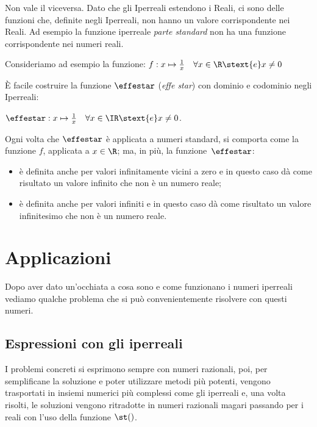 \begin{osservazione}
Non vale il viceversa. Dato che gli Iperreali estendono i Reali, ci sono 
delle funzioni che, definite negli Iperreali, non hanno un valore 
corrispondente nei Reali. Ad esempio la funzione iperreale \emph{parte 
standard} non ha una funzione corrispondente nei numeri reali.

\begin{esempio}
Consideriamo ad esempio la funzione: 
\(f: x \mapsto \frac{1}{x} \quad \forall x \in \R \stext{e} x \ne 0\)

È facile costruire la funzione \(\effestar\) (\emph{effe star}) con 
dominio e codominio negli Iperreali:

\(\effestar: x \mapsto \frac{1}{x} \quad 
\forall x \in \IR \stext{e} x \ne 0\).

Ogni volta che \(\effestar\) è applicata a numeri standard, si 
comporta come la funzione \(f\), applicata a \(x \in \R\); 
ma, in più, la funzione~\(\effestar\):
\begin{itemize} [noitemsep]
 \item 
è definita anche per valori infinitamente vicini a zero e 
in questo caso dà come risultato un valore infinito che non è un numero 
reale;
 \item 
è definita anche per valori infiniti e
in questo caso dà come risultato un valore infinitesimo che non è un numero 
reale. 
\end{itemize}
\end{esempio}
\end{osservazione}

\section{Applicazioni}
\label{sec:insnum_applicazioni}

Dopo aver dato un'occhiata a cosa sono e come funzionano i numeri 
iperreali vediamo qualche problema che si può convenientemente risolvere 
con questi numeri.

\subsection{Espressioni con gli iperreali}
\label{subsec:insnum_espressioni}

I problemi concreti si esprimono sempre con numeri razionali, poi, per 
semplificane la soluzione e poter utilizzare metodi più potenti, vengono 
trasportati in insiemi numerici più complessi come gli iperreali e, una volta 
risolti, le soluzioni vengono ritradotte in numeri razionali magari passando 
per i reali con l'uso della funzione \(\st()\).

